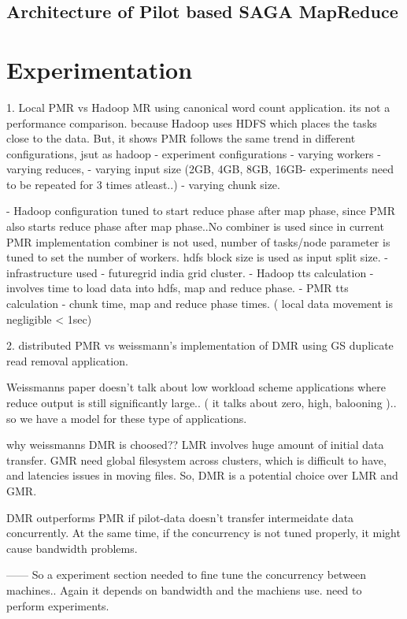 \documentclass{acm_proc_article-sp}
\begin{document}
\subsection{Architecture of Pilot based SAGA MapReduce}

\section{Experimentation}

1. Local PMR vs Hadoop MR using canonical word count application.
 its not a performance comparison. because Hadoop uses HDFS which places the tasks close to the data. But, it shows PMR follows the same trend in different configurations, jsut as hadoop
     - experiment configurations
         - varying workers
         - varying reduces,
         - varying input size (2GB, 4GB, 8GB, 16GB- experiments need to be repeated for 3 times atleast..)
         - varying chunk size.

     - Hadoop configuration tuned to start reduce phase after map phase, since PMR also starts reduce phase after map phase..No combiner is used since in current PMR implementation combiner is not used, number of tasks/node parameter is tuned to set the number of workers. hdfs block size is used as input split size. 
     - infrastructure used - futuregrid india grid cluster.
     - Hadoop tts calculation -involves time to load data into hdfs, map and reduce phase.
     - PMR tts calculation - chunk time, map and reduce phase times. ( local data movement is negligible < 1sec)

2. distributed PMR vs weissmann's implementation of  DMR using GS duplicate read removal application.

Weissmanns paper doesn't talk about low workload scheme applications where reduce output is still significantly large.. ( it talks about zero, high, balooning ).. so we have a model for these type of applications.

why weissmanns DMR is choosed?? LMR involves huge amount of initial data transfer. GMR need global filesystem across clusters, which is difficult to have, and latencies issues in moving files. So, DMR is a potential choice over LMR and GMR. 

DMR outperforms PMR if pilot-data doesn't transfer intermeidate data concurrently. At the same time, if the concurrency  is not tuned properly, it might cause bandwidth problems.

------ So a experiment section needed to fine tune the concurrency between machines.. Again it depends on bandwidth and the machiens use. need to perform experiments.
\end{document}
